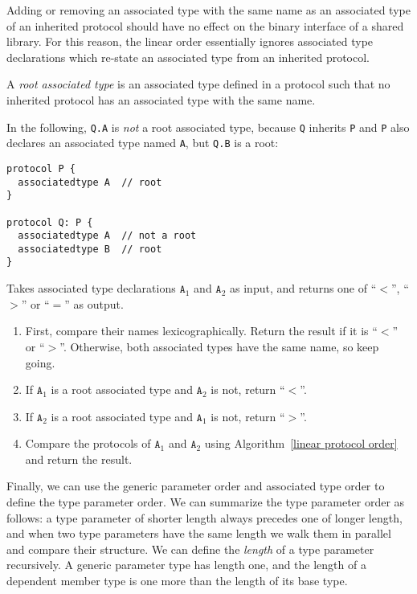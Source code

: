 \documentclass[../generics]{subfiles}
\begin{document}
Adding or removing an associated type with the same name as an associated type of an inherited protocol should have no effect on the binary interface of a shared library. For this reason, the linear order essentially ignores associated type declarations which re-state an associated type from an inherited protocol.
%
%
\begin{definition}\label{root associated type} A \emph{root associated type} is an associated type defined in a protocol such that no inherited protocol has an associated type with the same name.
\end{definition}
\begin{example} In the following, \texttt{Q.A} is \emph{not} a root associated type, because \texttt{Q} inherits \texttt{P} and \texttt{P} also declares an associated type named \texttt{A}, but \texttt{Q.B} is a root:
\begin{Verbatim}
protocol P {
  associatedtype A  // root
}

protocol Q: P {
  associatedtype A  // not a root
  associatedtype B  // root
}
\end{Verbatim}
\end{example}
%
\begin{algorithm}\label{associated type order}%
Takes associated type declarations $\texttt{A}_1$ and $\texttt{A}_2$ as input, and returns one of ``$<$'', ``$>$'' or ``$=$'' as output.
\begin{enumerate}
\item First, compare their names lexicographically. Return the result if it is ``$<$'' or ``$>$''. Otherwise, both associated types have the same name, so keep going.
\item If $\texttt{A}_1$ is a root associated type and $\texttt{A}_2$ is not, return ``$<$''.
\item If $\texttt{A}_2$ is a root associated type and $\texttt{A}_1$ is not, return ``$>$''.
\item Compare the protocols of $\texttt{A}_1$ and $\texttt{A}_2$ using Algorithm~\ref{linear protocol order} and return the result.
\end{enumerate}
\end{algorithm}
Finally, we can use the generic parameter order and associated type order to define the type parameter order. We can summarize the type parameter order as follows: a type parameter of shorter length always precedes one of longer length, and when two type parameters have the same length we walk them in parallel and compare their structure. We can define the \emph{length} of a type parameter recursively. A generic parameter type has length one, and the length of a dependent member type is one more than the length of its base type.
\end{document}
